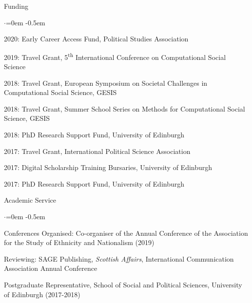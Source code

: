 \documentclass{resume} %
\begin{document}
\begin{rSection}{Funding}
\begin{list}{$\cdot$}{\leftmargin=0em} %
   \itemsep -0.5em %
    \item 2020: Early Career Access Fund, Political Studies Association
    \item 2019: Travel Grant, 5\textsuperscript{th} International Conference on Computational Social Science
    \item 2018: Travel Grant, European Symposium on Societal Challenges in Computational Social Science, GESIS
    \item 2018: Travel Grant, Summer School Series on Methods for Computational Social Science, GESIS
    \item 2018: PhD Research Support Fund, University of Edinburgh
    \item 2017: Travel Grant, International Political Science Association
    \item 2017: Digital Scholarship Training Bursaries, University of Edinburgh
    \item 2017: PhD Research Support Fund, University of Edinburgh
\end{list}
\end{rSection}

\begin{rSection}{Academic Service}
\begin{list}{$\cdot$}{\leftmargin=0em} %
   \itemsep -0.5em %
    \item Conferences Organised: Co-organiser of the Annual Conference of the Association for the Study of Ethnicity and Nationalism (2019)
    \item Reviewing: SAGE Publishing, \textit{Scottish Affairs}, International Communication Association Annual Conference
    \item Postgraduate Representative, School of Social and Political Sciences, University of Edinburgh (2017-2018)
\end{list}
\end{rSection}







\end{document}
